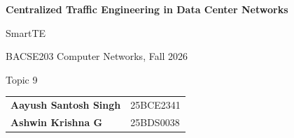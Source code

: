 \begin{titlepage}
\centering
\vspace*{0.9in}
{\LARGE \textbf{Centralized Traffic Engineering in Data Center Networks}\par}
\vspace{0.25in}
{\Large SmartTE\par}
\vspace{0.55in}
{\large BACSE203 Computer Networks, Fall 2026\par}
{\large Topic 9\par}
\vspace{0.35in}
\begin{tabular}{ll}
\textbf{Aayush Santosh Singh} & 25BCE2341 \\
\textbf{Ashwin Krishna G} & 25BDS0038
\end{tabular}
\vfill
\end{titlepage}
